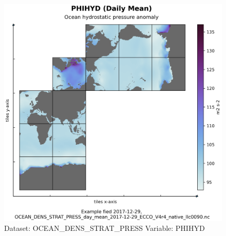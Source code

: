 \begin{figure}[H]
\centering
\includegraphics[scale=0.55]{../images/plots/native_plots/Ocean_Density_Stratification_and_Hydrostatic_Pressure/PHIHYD.png}
\caption{Dataset: OCEAN\_DENS\_STRAT\_PRESS Variable: PHIHYD}
\label{tab:table-OCEAN_DENS_STRAT_PRESS_PHIHYD-Plot}
\end{figure}
\pagebreak
